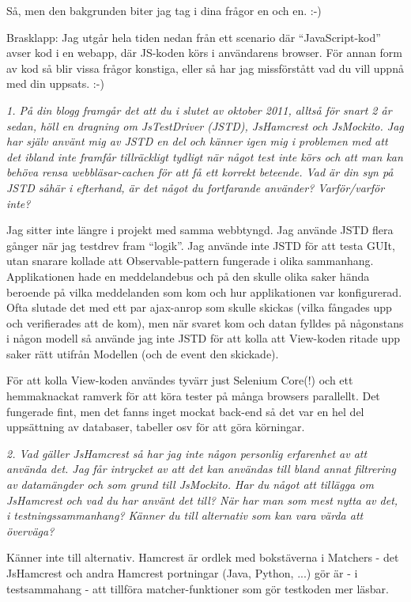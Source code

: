 \documentclass[11pt]{article}
\begin{document}
Så, men den bakgrunden biter jag tag i dina frågor en och en. :-)

Brasklapp: Jag utgår hela tiden nedan från ett scenario där
``JavaScript-kod'' avser kod i en webapp, där JS-koden körs i användarens
browser. För annan form av kod så blir vissa frågor konstiga, eller så
har jag missförstått vad du vill uppnå med din uppsats. :-)

\emph{1. På din blogg framgår det att du i slutet av oktober 2011, alltså för
snart 2 år sedan, höll en dragning om JsTestDriver (JSTD), JsHamcrest
och JsMockito. Jag har själv använt mig av JSTD en del och känner igen
mig i problemen med att det ibland inte framfår tillräckligt tydligt
när något test inte körs och att man kan behöva rensa webbläsar-cachen
för att få ett korrekt beteende. Vad är din syn på JSTD såhär i
efterhand, är det något du fortfarande använder? Varför/varför inte?}

Jag sitter inte längre i projekt med samma webbtyngd. Jag använde JSTD
flera gånger när jag testdrev fram ``logik''. Jag använde inte JSTD för
att testa GUIt, utan snarare kollade att Observable-pattern fungerade i
olika sammanhang. Applikationen hade en meddelandebus och på den skulle
olika saker hända beroende på vilka meddelanden som kom och hur
applikationen var konfigurerad. Ofta slutade det med ett par ajax-anrop
som skulle skickas (vilka fångades upp och verifierades att de kom), men
när svaret kom och datan fylldes på någonstans i någon modell så använde
jag inte JSTD för att kolla att View-koden ritade upp saker rätt utifrån
Modellen (och de event den skickade).

För att kolla View-koden användes tyvärr just Selenium Core(!) och ett
hemmaknackat ramverk för att köra tester på många browsers parallellt.
Det fungerade fint, men det fanns inget mockat back-end så det var en
hel del uppsättning av databaser, tabeller osv för att göra körningar.

\emph{2. Vad gäller JsHamcrest så har jag inte någon personlig erfarenhet av
att använda det. Jag får intrycket av att det kan användas till bland
annat filtrering av datamängder och som grund till JsMockito. Har du
något att tillägga om JsHamcrest och vad du har använt det till? När
har man som mest nytta av det, i testningssammanhang? Känner du till
alternativ som kan vara värda att överväga?}

Känner inte till alternativ. Hamcrest är ordlek med bokstäverna i
Matchers - det JsHamcrest och andra Hamcrest portningar (Java,
Python, ...) gör är - i testsammahang - att tillföra matcher-funktioner
som gör testkoden mer läsbar.
\end{document}
